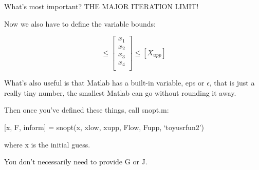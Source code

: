 What's most important? THE MAJOR ITERATION LIMIT!

Now we also have to define the variable bounds:


\begin{equation}
[X_{low}]
\leq
\begin{bmatrix}
x_{1} \\
x_{2} \\
x_{3} \\
x_{4} \\
\end{bmatrix}
\leq
[X_{upp}]
\label{eq:VariableBounds}
\end{equation}

What's also useful is that Matlab has a built-in variable, eps or $\epsilon$, that is just a really tiny number, the smallest Matlab can go without rounding it away. 

Then once you've defined these things, call snopt.m:

[x, F, inform] = snopt(x, xlow, xupp, Flow, Fupp, `toyusrfun2')

where x is the initial guess.

You don't necessarily need to provide G or J.